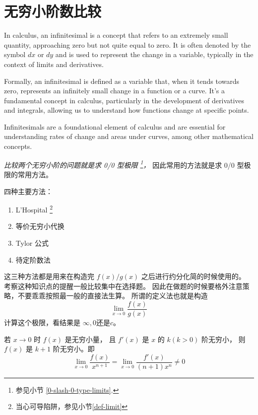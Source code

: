 \section{无穷小阶数比较}

\begin{definition}
    In calculus, an infinitesimal is a concept that refers 
    to an extremely small quantity, approaching zero 
    but not quite equal to zero. It is often denoted 
    by the symbol $dx$ or $dy$ and is used to represent 
    the change in a variable, typically in the context of 
    limits and derivatives.

    Formally, an infinitesimal is defined as a variable that, 
    when it tends towards zero, represents an infinitely 
    small change in a function or a curve. 
    It's a fundamental concept in calculus, 
    particularly in the development of derivatives and integrals, 
    allowing us to understand how functions change at specific points.

    Infinitesimals are a foundational element of calculus and 
    are essential for understanding rates of 
    change and areas under curves, among other mathematical concepts.
\end{definition}

\emph{比较两个无穷小阶的问题就是求 0/0 型极限
    \footnote{参见小节 \ref{0-slash-0-type-limits}.}，
}
因此常用的方法就是求 0/0 型极限的常用方法。

四种主要方法：
\begin{enumerate}
    \item L'Hospital \footnote{当心可导陷阱，参见小节\ref{def-limit}}
	\item 等价无穷小代换
	\item Tylor 公式
    \item 待定阶数法
\end{enumerate}

这三种方法都是用来在构造完 $f(x)/g(x)$ 之后进行约分化简的时候使用的。
考察这种知识点的提醒一般比较集中在选择题。
因此在做题的时候要格外注意策略，不要乖乖按照最一般的直接法生算。
所谓的定义法也就是构造
\[
    \lim_{x\to 0} \dfrac{f(x)}{g(x)}
\]
计算这个极限，看结果是 $\infty, 0$还是$c$。 

\begin{lemma}[L'Hospital求导定阶]
	若 $x \to 0$ 时 $f(x)$ 是无穷小量，
    且 $f'(x)$ 是 $x$ 的 $k(k>0)$ 阶无穷小，
	则 $f(x)$ 是 $k+1$ 阶无穷小。即
	\begin{equation}
		\lim_{x \to 0} \dfrac{f(x)}{x^{n+1}} 
        = 
        \lim_{x \to 0} \dfrac{f'(x)}{(n+1)x^{n}} \neq 0
	\end{equation}
\end{lemma}

